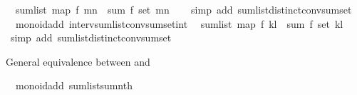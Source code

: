 \begin{isabellebody}
\ \ {\isachardoublequoteopen}sum{\isacharunderscore}{\kern0pt}list\ {\isacharparenleft}{\kern0pt}map\ f\ {\isacharbrackleft}{\kern0pt}m{\isachardot}{\kern0pt}{\isachardot}{\kern0pt}{\isacharless}{\kern0pt}n{\isacharbrackright}{\kern0pt}{\isacharparenright}{\kern0pt}\ {\isacharequal}{\kern0pt}\ sum\ f\ {\isacharparenleft}{\kern0pt}set\ {\isacharbrackleft}{\kern0pt}m{\isachardot}{\kern0pt}{\isachardot}{\kern0pt}{\isacharless}{\kern0pt}n{\isacharbrackright}{\kern0pt}{\isacharparenright}{\kern0pt}{\isachardoublequoteclose}\isanewline
%
\isadelimproof
\ \ %
\endisadelimproof
%
\isatagproof
{}\isamarkupfalse%
\ {\isacharparenleft}{\kern0pt}simp\ add{\isacharcolon}{\kern0pt}\ sum{\isacharunderscore}{\kern0pt}list{\isacharunderscore}{\kern0pt}distinct{\isacharunderscore}{\kern0pt}conv{\isacharunderscore}{\kern0pt}sum{\isacharunderscore}{\kern0pt}set{\isacharparenright}{\kern0pt}%
\endisatagproof
{\isafoldproof}%
%
\isadelimproof
\isanewline
%
\endisadelimproof
\isanewline
{}\isamarkupfalse%
\ {\isacharparenleft}{\kern0pt}\ monoid{\isacharunderscore}{\kern0pt}add{\isacharparenright}{\kern0pt}\ interv{\isacharunderscore}{\kern0pt}sum{\isacharunderscore}{\kern0pt}list{\isacharunderscore}{\kern0pt}conv{\isacharunderscore}{\kern0pt}sum{\isacharunderscore}{\kern0pt}set{\isacharunderscore}{\kern0pt}int{\isacharcolon}{\kern0pt}\isanewline
\ \ {\isachardoublequoteopen}sum{\isacharunderscore}{\kern0pt}list\ {\isacharparenleft}{\kern0pt}map\ f\ {\isacharbrackleft}{\kern0pt}k{\isachardot}{\kern0pt}{\isachardot}{\kern0pt}l{\isacharbrackright}{\kern0pt}{\isacharparenright}{\kern0pt}\ {\isacharequal}{\kern0pt}\ sum\ f\ {\isacharparenleft}{\kern0pt}set\ {\isacharbrackleft}{\kern0pt}k{\isachardot}{\kern0pt}{\isachardot}{\kern0pt}l{\isacharbrackright}{\kern0pt}{\isacharparenright}{\kern0pt}{\isachardoublequoteclose}\isanewline
%
\isadelimproof
\ \ %
\endisadelimproof
%
\isatagproof
{}\isamarkupfalse%
\ {\isacharparenleft}{\kern0pt}simp\ add{\isacharcolon}{\kern0pt}\ sum{\isacharunderscore}{\kern0pt}list{\isacharunderscore}{\kern0pt}distinct{\isacharunderscore}{\kern0pt}conv{\isacharunderscore}{\kern0pt}sum{\isacharunderscore}{\kern0pt}set{\isacharparenright}{\kern0pt}%
\endisatagproof
{\isafoldproof}%
%
\isadelimproof
%
\endisadelimproof
%
\begin{isamarkuptext}%
General equivalence between  and %
\end{isamarkuptext}\isamarkuptrue%
\isamarkupfalse%
\ {\isacharparenleft}{\kern0pt}\ monoid{\isacharunderscore}{\kern0pt}add{\isacharparenright}{\kern0pt}\ sum{\isacharunderscore}{\kern0pt}list{\isacharunderscore}{\kern0pt}sum{\isacharunderscore}{\kern0pt}nth{\isacharcolon}{\kern0pt}\isanewline

\end{isabellebody}
